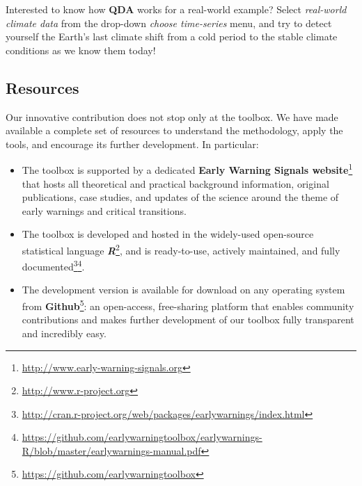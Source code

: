 \documentclass[12pt,a4paper,final]{article}
\begin{document}
\begin{doublespacing}
Interested to know how \textbf{QDA} works for a real-world example? Select \textit{real-world climate data} from the drop-down \textit{choose time-series} menu, and try to detect yourself the Earth's last climate shift from a cold period to the stable climate conditions as we know them today!


\subsection{Resources} 

\label{sec:resources}
Our innovative contribution does not stop only at the toolbox. We have made available a complete set of resources to understand the methodology, apply the tools, and encourage its further development. In particular:
\begin{itemize}
\item The toolbox is supported by a dedicated \textbf{Early Warning Signals website}\footnote{\url{http://www.early-warning-signals.org}} that hosts all theoretical and practical background information, original publications, case studies, and updates of the science around the theme of early warnings and critical transitions. 
\item The toolbox is developed and hosted in the widely-used open-source statistical language \textbf{\textit{R}}\footnote{\url{http://www.r-project.org}}, and is ready-to-use, actively maintained, and fully documented\footnote{\url{http://cran.r-project.org/web/packages/earlywarnings/index.html}}\footnote{\url{https://github.com/earlywarningtoolbox/earlywarnings-R/blob/master/earlywarnings-manual.pdf}}.
\item The development version is available for download on any operating system from \textbf{Github}\footnote{\url{https://github.com/earlywarningtoolbox}}: an open-access, free-sharing platform that enables community contributions and makes further development of our toolbox fully transparent and incredibly easy.
 \end{itemize}



\end{doublespacing}
\end{document}
